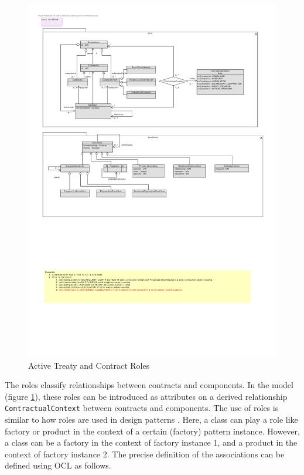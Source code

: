 \documentclass{llncs}
\begin{document}
 \begin{figure}[t]
\centering
\includegraphics[width=1.0\textwidth]{RoleModel2.pdf}
\caption{Active Treaty and Contract Roles}
\label{fig2}
\end{figure}

The roles classify relationships between contracts and components. In the model (figure \ref{fig2}), these roles can be introduced as attributes on a derived relationship \texttt{ContractualContext} between contracts and components. The use of roles is similar to how roles are used in design patterns \cite{GangOf4}. Here, a class can play a role like factory or product in the context of a certain (factory) pattern instance. However, a class can be a factory in the context of factory instance 1, and a product in the context of factory instance 2. The precise definition of the associations can be defined using OCL as follows. 
\end{document}

